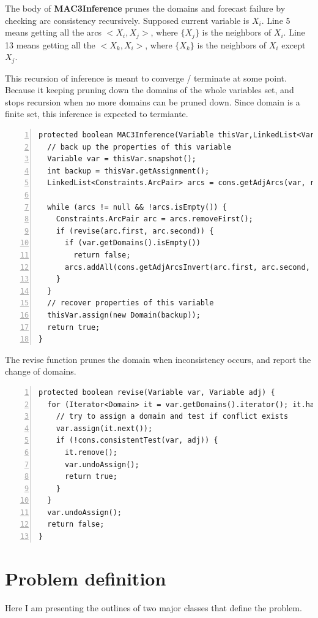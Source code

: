 \documentclass{article}
\begin{document}
The body of \textbf{MAC3Inference} prunes the domains and forecast failure by checking arc consistency recursively. Supposed current variable is $X_i$. Line 5 means getting all the arcs $<X_i, X_j>$, where $\{X_j\}$ is the neighbors of $X_i$. Line 13 means getting all the $<X_k, X_i>$, where $\{X_k\}$ is the neighbors of $X_i$ except $X_j$.

This recursion of inference is meant to converge / terminate at some point.  Because it keeping pruning down the domains of the whole variables set, and stops recursion when no more domains can be pruned down. Since domain is a finite set, this inference is expected to termiante.

\begin{lstlisting}[numbers=left]   
protected boolean MAC3Inference(Variable thisVar,LinkedList<Variable> remain){
  // back up the properties of this variable
  Variable var = thisVar.snapshot();
  int backup = thisVar.getAssignment();
  LinkedList<Constraints.ArcPair> arcs = cons.getAdjArcs(var, remain);

  while (arcs != null && !arcs.isEmpty()) {
    Constraints.ArcPair arc = arcs.removeFirst();
    if (revise(arc.first, arc.second)) {
      if (var.getDomains().isEmpty())
        return false;
      arcs.addAll(cons.getAdjArcsInvert(arc.first, arc.second, remain));
    }
  }
  // recover properties of this variable
  thisVar.assign(new Domain(backup));
  return true;
}
\end{lstlisting}

The revise function prunes the domain when inconsistency occurs, and report the change of domains.

\begin{lstlisting}[numbers=left]   
protected boolean revise(Variable var, Variable adj) {
  for (Iterator<Domain> it = var.getDomains().iterator(); it.hasNext(); ) {
    // try to assign a domain and test if conflict exists
    var.assign(it.next());
    if (!cons.consistentTest(var, adj)) {
      it.remove();
      var.undoAssign();
      return true;
    }
  }
  var.undoAssign();
  return false;
}
\end{lstlisting}














\clearpage
\section{Problem definition}
Here I am presenting the outlines of two major classes that define the problem.
\end{document}
